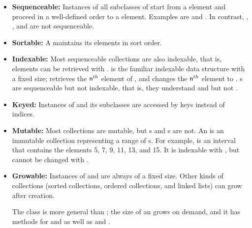 \documentclass[a4paper,10pt,twoside]{book}
\begin{document}
\begin{itemize}
  \item {\bf Sequenceable:}
  Instances of all subclasses of  start from a  element and proceed in a well-defined order to a  element. Examples are  and . 
  In contrast, , , and  are not sequenceable.

  \item {\bf Sortable:}
  A  maintains its elements in sort order.

  \item {\bf Indexable:}
	Most sequenceable collections are also indexable, that is, elements can be retrieved with .
	 is the familiar indexable data structure with a fixed size;  retrieves the $\mbox{\ct{n}}^{th}$ element of , and  changes the $\mbox{\ct{n}}^{th}$ element to .
	s are sequenceable but not indexable, that is, they understand  and  but not .

  \item {\bf Keyed:}
	Instances of  and its subclasses are accessed by keys instead of indices.

  \item {\bf Mutable:}
  	Most collections are mutable, but s and s are not.
  An  is an immutable collection representing a range of s.
  For example,  is an interval that contains the elements 5, 7, 9, 11, 13, and 15.
  It is indexable with , but cannot be changed with .

  \item {\bf Growable:}
    Instances of  and  are always of a fixed size.
    Other kinds of collections (sorted collections, ordered collections, and linked lists) can grow after creation.
	
	The class  is more general than ; the size of an  grows on demand, and it has methods for  and  as well as  and .
  

\end{itemize}
\end{document}
